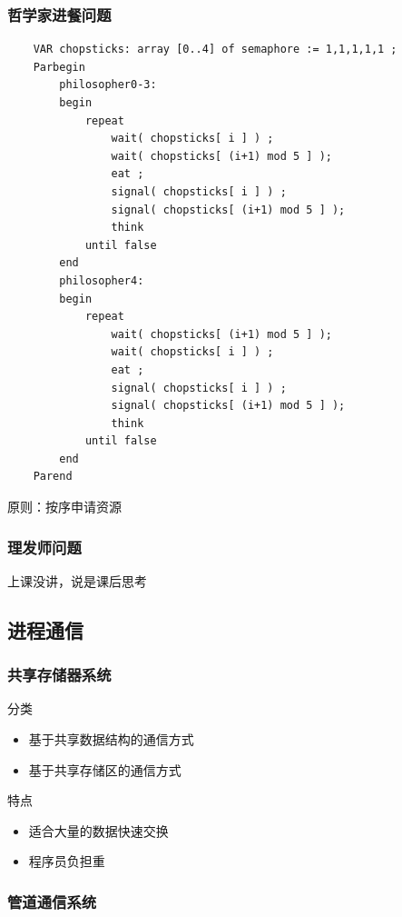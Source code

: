 \documentclass[12pt, a4paper, oneside]{ctexart}
\begin{document}
\subsubsection{哲学家进餐问题}

\begin{lstlisting}
    VAR chopsticks: array [0..4] of semaphore := 1,1,1,1,1 ;
    Parbegin
        philosopher0-3:
        begin
            repeat
                wait( chopsticks[ i ] ) ;
                wait( chopsticks[ (i+1) mod 5 ] );
                eat ;
                signal( chopsticks[ i ] ) ;
                signal( chopsticks[ (i+1) mod 5 ] );
                think
            until false
        end
        philosopher4:
        begin
            repeat
                wait( chopsticks[ (i+1) mod 5 ] );
                wait( chopsticks[ i ] ) ;
                eat ;
                signal( chopsticks[ i ] ) ;
                signal( chopsticks[ (i+1) mod 5 ] );
                think
            until false
        end
    Parend
\end{lstlisting}

原则：按序申请资源

\subsubsection{理发师问题}

上课没讲，说是课后思考

\subsection{进程通信}

\subsubsection{共享存储器系统}

分类
\begin{itemize}
    \item 基于共享数据结构的通信方式
    \item 基于共享存储区的通信方式
\end{itemize}

特点
\begin{itemize}
    \item 适合大量的数据快速交换
    \item 程序员负担重
\end{itemize}

\subsubsection{管道通信系统}
\end{document}
